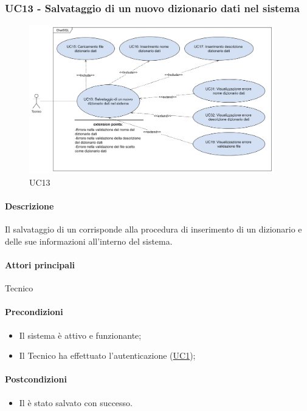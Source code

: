 \subsubsection{UC13 - Salvataggio di un nuovo dizionario dati nel sistema}\label{UC13}

\begin{figure}[H]
  \centering
  \includegraphics[width=0.95\textwidth]{assets/uc13.png}
  \caption{UC13}
\end{figure}

\paragraph*{Descrizione}
Il salvataggio di un  corrisponde alla procedura di inserimento di un dizionario e delle sue informazioni all'interno del sistema.

\paragraph*{Attori principali}
Tecnico

\paragraph*{Precondizioni}
\begin{itemize}
  \item Il sistema è attivo e funzionante;
  \item Il Tecnico ha effettuato l'autenticazione (\hyperref[UC1]{UC1});
\end{itemize}

\paragraph*{Postcondizioni}
\begin{itemize}
  \item Il  è stato salvato con successo.
\end{itemize}


